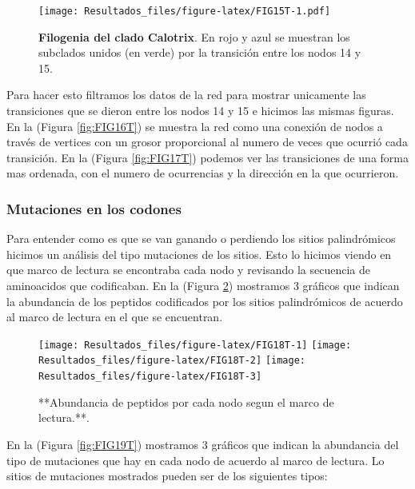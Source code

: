 \documentclass[
]{book}
\begin{document}
\begin{figure}
\centering
\texttt{[image: Resultados\_files/figure-latex/FIG15T-1.pdf]}
\caption{\label{fig:FIG15T}\textbf{Filogenia del clado Calotrix}. En rojo y azul se muestran los subclados unidos (en verde) por la transición entre los nodos 14 y 15.}
\end{figure}

Para hacer esto filtramos los datos de la red para mostrar unicamente las transiciones que se dieron entre los nodos 14 y 15 e hicimos las mismas figuras.
En la (Figura \ref{fig:FIG16T}) se muestra la red como una conexión de nodos a través de vertices con un grosor proporcional al numero de veces que ocurrió cada transición. En la (Figura \ref{fig:FIG17T}) podemos ver las transiciones de una forma mas ordenada, con el numero de ocurrencias y la dirección en la que ocurrieron.

\hypertarget{mutaciones-en-los-codones-7}{%
\subsubsection{Mutaciones en los codones}\label{mutaciones-en-los-codones-7}}

Para entender como es que se van ganando o perdiendo los sitios palindrómicos hicimos un análisis del tipo mutaciones de los sitios. Esto lo hicimos viendo en que marco de lectura se encontraba cada nodo y revisando la secuencia de aminoacidos que codificaban. En la (Figura \ref{fig:FIG18T}) mostramos 3 gráficos que indican la abundancia de los peptidos codificados por los sitios palindrómicos de acuerdo al marco de lectura en el que se encuentran.

\begin{figure}

{\centering \texttt{[image: Resultados\_files/figure-latex/FIG18T-1]} \texttt{[image: Resultados\_files/figure-latex/FIG18T-2]} \texttt{[image: Resultados\_files/figure-latex/FIG18T-3]} 

}

\caption{**Abundancia de peptidos por cada nodo segun el marco de lectura.**.}\label{fig:FIG18T}
\end{figure}

En la (Figura \ref{fig:FIG19T}) mostramos 3 gráficos que indican la abundancia del tipo de mutaciones que hay en cada nodo de acuerdo al marco de lectura. Lo sitios de mutaciones mostrados pueden ser de los siguientes tipos:
\end{document}
